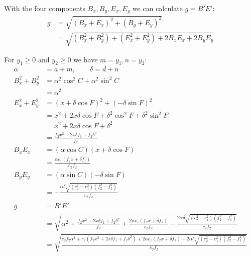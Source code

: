 \documentclass[11pt]{article}
\begin{document}
With the four components $B_x, B_y, E_x, E_y$ we can calculate $g = \overline{B'E'}$:
\begin{align}
g &= \sqrt{(B_x + E_x)^2 + (B_y + E_y)^2} \\
 &= \sqrt{(B_x^2 + B_y^2) + (E_x^2 + E_y^2) + 2B_xE_x + 2B_yE_y}
\end{align}

For $y_1 \geq 0$ and $y_2 \geq 0$ we have $m=y_1, n=y_2$:
\begin{align}
\alpha &= a + m, \qquad \delta = d + n\\
B_x^2 + B_y^2 &= \alpha^2\cos^2{C} + \alpha^2\sin^2{C} \nonumber\\
 &= \alpha^2\\
E_x^2 + E_y^2 &= (x + \delta\cos{F})^2 + (-\delta\sin{F})^2 \nonumber\\
 &= x^2 + 2x\delta\cos{F} + \delta^2\cos^2{F} + \delta^2\sin^2{F} \nonumber\\
 &= x^2 + 2x\delta\cos{F} + \delta^2 \nonumber\\
 &= \frac{f_2x^2 + 2x\delta f_1 + f_2\delta^2}{f_2}\\
B_xE_x &= (\alpha\cos{C})(x + \delta\cos{F}) \nonumber\\
 &= \frac{\alpha c_1(f_2x + \delta f_1)}{c_2f_2} \\
B_yE_y &= (\alpha\sin{C})(-\delta\sin{F})\nonumber\\
 &= -\frac{\alpha \delta\sqrt{(c_2^2 - c_1^2)(f_2^2 - f_1^2)}}{c_2f_2}\\
g &= \overline{B'E'}\nonumber\\
 &= \sqrt{
\alpha^2
+ \frac{f_2x^2 + 2x\delta f_1 + f_2\delta^2}{f_2}
+ \frac{2\alpha c_1(f_2x + \delta f_1)}{c_2f_2}
- \frac{2\alpha \delta\sqrt{(c_2^2 - c_1^2)(f_2^2 - f_1^2)}}{c_2f_2}
}\nonumber\\
 &= \sqrt{\frac{
c_2f_2\alpha^2  
+ c_2(f_2x^2 + 2x\delta f_1 + f_2\delta^2)
+ 2\alpha c_1(f_2x + \delta f_1)
- 2\alpha \delta\sqrt{(c_2^2 - c_1^2)(f_2^2 - f_1^2)}
}{c_2f_2}}\nonumber\\
\end{align}
\end{document}
